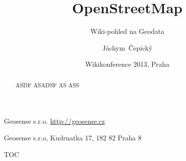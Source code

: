 


\subtitle {Wiki-pohled na Geodata}






\title[OpenStreetMap] %
{OpenStreetMap}

\mode*

\author[J. Čepický] %
{Jáchym~Čepický}

\institute %
{
  Geosense s.r.o.
  \url{http://geosense.cz}\\
}
  

\date[] %
{Wikikonference 2013, Praha}

\maketitle
\institutename
Geosense s.r.o, Kudrnatka 17, 182 82 Praha 8

\begin{abstract}

\noindent ASDF ASADSF AS ASS

\end{abstract}

\begin{frame}
  \titlepage
\end{frame}

\begin{frame}{TOC}
  \tableofcontents
\end{frame}



